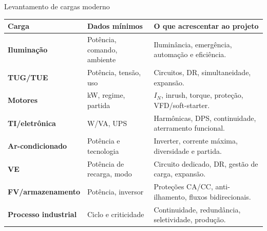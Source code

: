 \begin{frame}{Levantamento de cargas moderno}
\scriptsize
\begin{tabularx}{\textwidth}{>{\bfseries}p{2.6cm}p{3.1cm}X}
\toprule
Carga & Dados mínimos & O que acrescentar ao projeto \\
\midrule
Iluminação & Potência, comando, ambiente & Iluminância, emergência, automação e eficiência. \\
TUG/TUE & Potência, tensão, uso & Circuitos, DR, simultaneidade, expansão. \\
Motores & kW, regime, partida & $I_N$, inrush, torque, proteção, VFD/soft-starter. \\
TI/eletrônica & W/VA, UPS & Harmônicas, DPS, continuidade, aterramento funcional. \\
Ar-condicionado & Potência e tecnologia & Inverter, corrente máxima, diversidade e partida. \\
VE & Potência de recarga, modo & Circuito dedicado, DR, gestão de carga, expansão. \\
FV/armazenamento & Potência, inversor & Proteções CA/CC, anti-ilhamento, fluxos bidirecionais. \\
Processo industrial & Ciclo e criticidade & Continuidade, redundância, seletividade, produção. \\
\bottomrule
\end{tabularx}
\end{frame}

